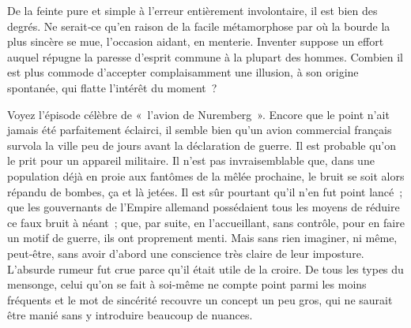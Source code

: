 \documentclass[french,twoside]{book} %
\newcommand{\astermono}{\medskip\centerline{\color{rubric}\large\selectfont{\syms ✻}}\medskip\par}%
\begin{document}
\noindent De la feinte pure et simple à l’erreur entièrement involontaire, il est bien des degrés. Ne serait‑ce qu’en raison de la facile métamorphose par où la bourde la plus sincère se mue, l’occasion aidant, en menterie. In­venter suppose un effort auquel répugne la paresse d’esprit commune à la plupart des hommes. Combien il est plus commode d’accepter complai­samment une illusion, à son origine spontanée, qui flatte l’intérêt du moment ?\par
Voyez l’épisode célèbre de « l’avion de Nuremberg ». Encore que le point n’ait jamais été parfaitement éclairci, il semble bien qu’un avion commercial français survola la ville peu de jours avant la déclaration de guerre. Il est probable qu’on le prit pour un appareil militaire. Il n’est pas invraisemblable que, dans une population déjà en proie aux fantômes de la mêlée prochaine, le bruit se soit alors répandu de bombes, ça et là jetées. Il est sûr pourtant qu’il n’en fut point lancé ; que les gouvernants de l’Empire allemand possédaient tous les moyens de réduire ce faux bruit à néant ; que, par suite, en l’accueillant, sans contrôle, pour en faire un motif de guerre, ils ont proprement menti. Mais sans rien imaginer, ni même, peut‑être, sans avoir d’abord une conscience très claire de leur imposture. L’absurde rumeur fut crue parce qu’il était utile de la croire. De tous les types du mensonge, celui qu’on se fait à soi-même ne compte point parmi les moins fréquents et le mot de sincérité recouvre un concept un peu gros, qui ne saurait être manié sans y introduire beaucoup de nuances.\par

\astermono
\end{document}
